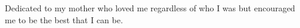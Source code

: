 
\thispagestyle{empty}


\vspace*{3cm}

\medskip

\begin{center}
Dedicated to my mother who loved me regardless of who I was but encouraged me to be the best that I can be.
\end{center}